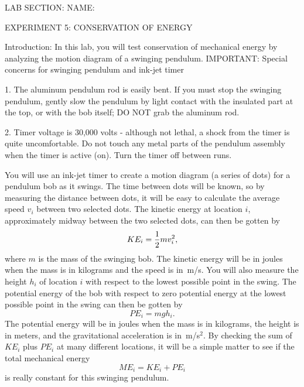 
\baselineskip=15pt
\vglue-0.7in
\hglue-2.0cm LAB SECTION:
\underbar{~~~~~~~~~~~~~~~~~~~~~~~~~~~~~~~~~~~~~~~~~~~~~~}
 NAME:
\rlap{
\underbar{~~~~~~~~~~~~~~~~~~~~~~~~~~~~~~~~~~~~~~~~~~~~~~}
}
\bigskip
\bigskip
\bigskip
\centerline{EXPERIMENT 5: CONSERVATION OF ENERGY}
\bigskip
Introduction:
In this lab, you will test conservation of mechanical energy by
analyzing the motion diagram of a swinging pendulum.  
\bigskip
%
%
IMPORTANT: Special concerns for swinging pendulum and ink-jet timer
\item{1.} The aluminum pendulum rod is easily bent.  If you
must stop the swinging pendulum, gently slow the pendulum by 
light contact with the insulated part at the top, or with the 
bob itself; DO NOT grab the aluminum rod. 
\item{2.} Timer voltage is 30,000 volts - although not lethal, 
a shock from the timer is quite uncomfortable.  Do not touch
any metal parts of the pendulum assembly when the timer is 
active (on).  Turn the timer off between runs.
\bigskip

You will use an ink-jet timer to create a motion diagram (a series
of dots) for a pendulum bob as it swings.  The time between dots 
will be known, so by measuring the distance between dots, it will
be easy to calculate the average speed $v_i$ between two selected
dots.  The kinetic energy at location $i$, approximately midway 
between the two selected dots, can then be gotten by
$$KE_i = {1\over 2}mv_i^2,$$
where $m$ is the mass of the swinging bob.  The kinetic energy will
be in joules when the mass is in kilograms and the speed is in~m/s.
You will also measure the height $h_i$ of location $i$ with respect to 
the lowest possible point in the swing.  The potential energy of the 
bob with respect to zero potential energy at the lowest possible 
point in the swing can then be gotten by
$$PE_i = mgh_i.$$
The potential energy will be in joules when the mass is in kilograms,
the height is in meters, and the gravitational acceleration is 
in~m/s$^2$.  By checking the sum of $KE_i$ plus $PE_i$ at many 
different locations, it will be a simple matter to see if the total 
mechanical energy
$$ME_i = KE_i + PE_i$$
is really constant for this swinging pendulum.
\vfil\eject
{}

